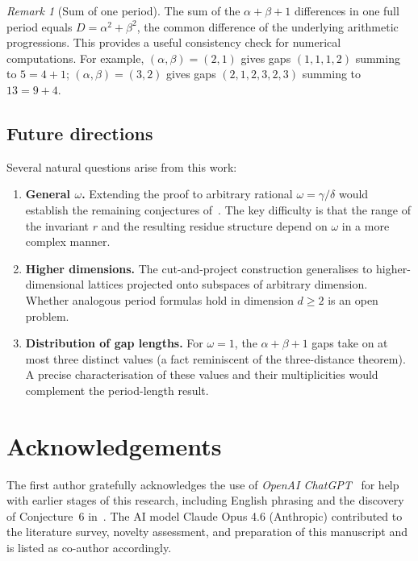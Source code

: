 \documentclass[11pt]{article}
\theoremstyle{plain}
\theoremstyle{definition}
\theoremstyle{remark}
\newtheorem{remark}[theorem]{Remark}
\begin{document}
\begin{remark}[Sum of one period]
The sum of the $\alpha+\beta+1$ differences in one full period equals
$D = \alpha^2+\beta^2$, the common difference of the underlying arithmetic
progressions.  This provides a useful consistency check for numerical
computations.  For example, $(\alpha,\beta)=(2,1)$ gives gaps
$(1,1,1,2)$ summing to $5 = 4+1$; $(\alpha,\beta)=(3,2)$ gives gaps
$(2,1,2,3,2,3)$ summing to $13 = 9+4$.
\end{remark}

\subsection{Future directions}

Several natural questions arise from this work:

\begin{enumerate}
    \item \textbf{General $\omega$.}
    Extending the proof to arbitrary rational $\omega = \gamma/\delta$ would
    establish the remaining conjectures of~\cite{Kunert2025conjectures}.  The
    key difficulty is that the range of the invariant $r$ and the resulting
    residue structure depend on $\omega$ in a more complex manner.

    \item \textbf{Higher dimensions.}
    The cut-and-project construction generalises to higher-dimensional lattices
    projected onto subspaces of arbitrary dimension.  Whether analogous period
    formulas hold in dimension $d \ge 2$ is an open problem.

    \item \textbf{Distribution of gap lengths.}
    For $\omega = 1$, the $\alpha+\beta+1$ gaps take on at most three distinct
    values (a fact reminiscent of the three-distance theorem).
    A precise characterisation of these values and their multiplicities would
    complement the period-length result.
\end{enumerate}

\section*{Acknowledgements}

The first author gratefully acknowledges the use of \emph{OpenAI
ChatGPT}~\cite{ChatGPT} for help with earlier stages of this research,
including English phrasing and the discovery of Conjecture~6
in~\cite{Kunert2025conjectures}.
The AI model Claude Opus 4.6 (Anthropic) contributed to the literature
survey, novelty assessment, and preparation of this manuscript and is listed
as co-author accordingly.
\end{document}
